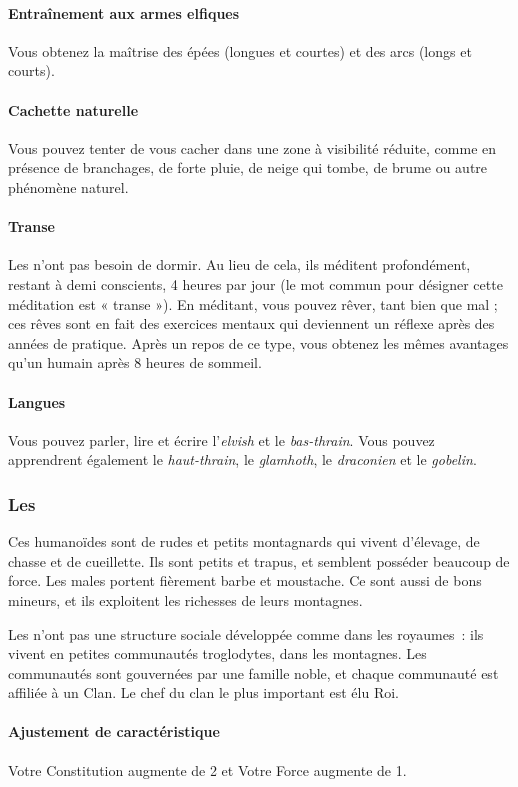 \documentclass[a4paper,10pt,openany]{book}
\begin{document}
\begin{multicols}{2}
\paragraph{Entraînement aux armes elfiques}
Vous obtenez la maîtrise des épées (longues et courtes) et des arcs (longs et courts).
\paragraph{Cachette naturelle}
Vous pouvez tenter de vous cacher dans une zone à visibilité réduite, comme en présence de branchages, de forte pluie, de neige qui tombe, de brume ou
autre phénomène naturel.
\paragraph{Transe}
Les \Elfes n’ont pas besoin de dormir. Au lieu de cela, ils méditent profondément, restant à demi conscients, 4 heures par jour (le mot commun pour
désigner cette méditation est « transe »). En méditant, vous pouvez rêver, tant bien que mal ; ces rêves sont en fait des exercices mentaux qui
deviennent un réflexe après des années de pratique. Après un repos de ce type, vous obtenez les mêmes avantages qu’un humain après 8 heures de
sommeil.
\paragraph{Langues}
Vous pouvez parler, lire et écrire l’\emph{elvish} et le \emph{bas-thrain}. Vous pouvez apprendrent également le \emph{haut-thrain}, le
\emph{glamhoth}, le \emph{draconien} et le \emph{gobelin}.

\subsubsection{Les \Nains}
Ces humanoïdes sont de rudes et petits montagnards qui vivent d’élevage, de chasse et de cueillette. Ils sont petits et trapus, et semblent posséder
beaucoup de force. Les males portent fièrement barbe et moustache. Ce sont aussi de bons mineurs, et ils exploitent les richesses de leurs
montagnes.\par Les \Nains n’ont pas une structure sociale développée comme dans les royaumes : ils vivent en petites communautés troglodytes, dans les
montagnes. Les communautés sont gouvernées par une famille noble, et chaque communauté est affiliée à un Clan. Le chef du clan le plus important est
élu Roi.
\paragraph{Ajustement de caractéristique}
Votre Constitution augmente de 2 et Votre Force augmente de 1.

\end{multicols}
\end{document}
